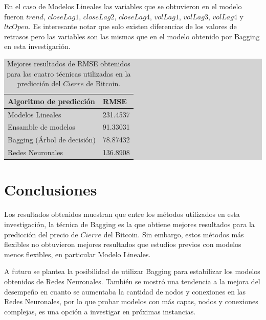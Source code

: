 \documentclass[a4paper,12pt,twocolumn]{article}
\begin{document}
En el caso de Modelos Lineales las variables que se obtuvieron en el modelo fueron $trend$, $closeLag1$, $closeLag2$, $closeLag4$,  $volLag1$, $volLag3$, $volLag4$ y $ltcOpen$. Es interesante notar que solo existen diferencias de los valores de retrasos pero las variables son las mismas que en el modelo obtenido por Bagging en esta investigación. 

\begin{table}[!hbt]
\centering
\caption{Mejores resultados de RMSE obtenidos para las cuatro técnicas utilizadas en la predicción del $Cierre$ de Bitcoin. }
\label{RMSEFinal}
\begingroup\setlength{\fboxsep}{0pt}
\colorbox{lightgray}{%
\begin{tabular}{|l|l|}
\hline Algoritmo de predicción & RMSE \\
\hline Modelos Lineales & 231.4537\\
\hline Ensamble de modelos & 91.33031\\
\hline Bagging (Árbol de decisión)& 78.87432\\
\hline Redes Neuronales & 136.8908 \\
\hline
\end{tabular}%
}\endgroup
\end{table}
   
\section{Conclusiones}

Los resultados obtenidos muestran que entre los métodos utilizados en esta investigación, la técnica de Bagging es la que obtiene mejores resultados para la predicción del precio de $Cierre$ del Bitcoin. Sin embargo, estos métodos más flexibles no obtuvieron mejores resultados que estudios previos con modelos menos flexibles, en particular Modelo Lineales. 

A futuro se plantea la posibilidad de utilizar Bagging para estabilizar los modelos obtenidos de Redes Neuronales. También se mostró una tendencia a la mejora del desempeño en cuanto se aumentaba la cantidad de nodos y conexiones en las Redes Neuronales, por lo que probar modelos con más capas, nodos y conexiones complejas, es una opción a investigar en próximas instancias.
     
\end{document}
